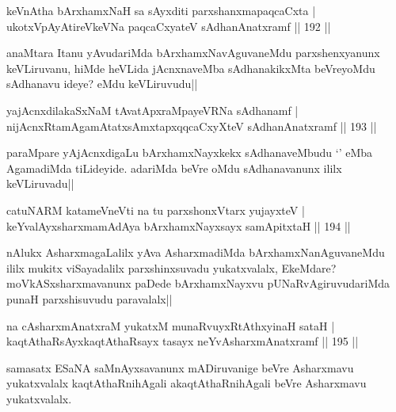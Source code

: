 
\begin{shl}
keVnAtha bArxhamxNaH sa sAyxditi parxshanxmapaqcaCxta |\\
ukotxVpAyAtireVkeVNa paqcaCxyateV sAdhanAnatxramf \hfill || 192 ||
\end{shl}

\begin{artha}
anaMtara Itanu yAvudariMda bArxhamxNavAguvaneMdu parxshenxyanunx keVLiruvanu, hiMde heVLida jAcnxnaveMba sAdhanakikxMta beVreyoMdu sAdhanavu ideye? eMdu keVLiruvudu||
\end{artha}


\begin{shl}
yajAcnxdilakaSxNaM tAvatApxraMpayeVRNa sAdhanamf |\\
nijAcnxRtamAgamAtatxsAmxtapxqqcaCxyXteV sAdhanAnatxramf \hfill || 193 ||
\end{shl}

\begin{artha}
paraMpare yAjAcnxdigaLu bArxhamxNayxkekx sAdhanaveMbudu `\stext ' eMba AgamadiMda tiLideyide. adariMda beVre oMdu sAdhanavanunx ililx keVLiruvadu||
\end{artha}

\begin{shl}
catuNARM katameVneVti na tu parxshonxV\s tarx yujayxteV |\\
keYvalAyxsharxmamAdAya bArxhamxNayxsayx samApitxtaH \hfill || 194 ||
\end{shl}

\begin{artha}
nAlukx AsharxmagaLalilx yAva AsharxmadiMda bArxhamxNanAguvaneMdu ililx mukitx viSayadalilx parxshinxsuvadu yukatxvalalx, EkeMdare? moVkASxsharxmavanunx paDede bArxhamxNayxvu pUNaRvAgiruvudariMda punaH parxshisuvudu paravalalx||
\end{artha}

\begin{shl}
na cA\s \s sharxmAnatxraM yukatxM munaRvuyxRtAthxyinaH sataH |\\
kaqtAthaRsAyxkaqtAthaRsayx tasayx neYvA\s \s sharxmAnatxramf \hfill || 195 ||
\end{shl}

\begin{artha}%
samasatx ESaNA saMnAyxsavanunx mADiruvanige beVre Asharxmavu yukatxvalalx kaqtAthaRnihAgali akaqtAthaRnihAgali beVre Asharxmavu yukatxvalalx.
\end{artha}


